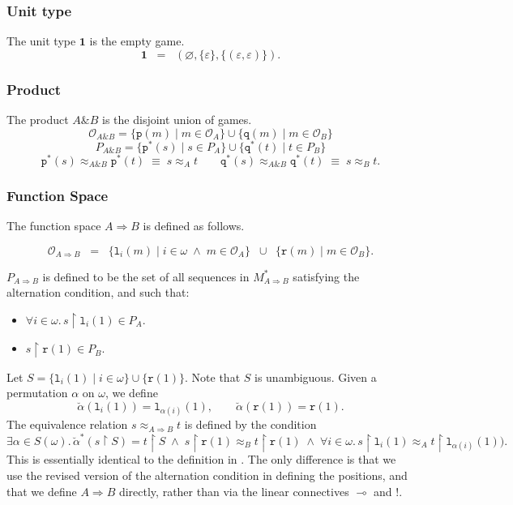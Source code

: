 \documentclass[a4paper,11pt]{article}
\newcommand{\gequiv}{\approx}
\newcommand{\restrict}{{\upharpoonright}}
\newcommand{\Occ}{\mathcal{O}}
\newcommand{\al}{\mathtt{p}}
\newcommand{\ar}{\mathtt{q}}
\newcommand{\fr}{\mathtt{r}}
\newcommand{\fl}[1]{\mathtt{l}_{#1}}
\begin{document}
\subsubsection*{Unit type}
The unit type $\mathbf{1}$ is the empty game.
\[ \mathbf{1} \;\; = \;\; ( \varnothing ,  \{ \varepsilon  \}
, \{ (\varepsilon , \varepsilon ) \} ) . \]

\subsubsection*{Product}
The product $A \& B$ is the disjoint union of games.
\[ \Occ_{A \& B} = \{ \al (m) \mid m \in \Occ_A \} \cup \{ \ar (m)
\mid m \in \Occ_B \} \]
\[ P_{A \& B} =  \{ \al^{\ast} (s) \mid s \in P_A \} \cup \{ \ar^{\ast} (t) \mid
t \in P_B \} \]
\[ \al^{\ast}(s) \gequiv_{A \& B} \al^{\ast}(t) \; \equiv \; s
\gequiv_A t \qquad \ar^{\ast}(s) \gequiv_{A \& B} \ar^{\ast}(t) \; \equiv \; s
\gequiv_B t . \]


\subsubsection*{Function Space}
The function space $A \Rightarrow B$ is defined as follows.

\[ \Occ_{A \Rightarrow B} \;\; = \;\; \{ \fl{i}(m) \mid i \in \omega
\; \wedge \; m \in \Occ_A \} \;\; \cup \;\; \{ \fr (m) \mid m \in
\Occ_B \} .  \]

\noindent $P_{A \Rightarrow B}$ is defined to be the set of all sequences in
$M_{A \Rightarrow B}^{\ast}$ satisfying the alternation condition, and
such that:
\begin{itemize}
\item $\forall i \in \omega . \, s \restrict \fl{i}(1) \in P_A$.
\item $s \restrict \fr (1) \in P_B$.
\end{itemize}
Let $S = \{ \fl{i}(1) \mid i \in \omega \} \cup \{ \fr (1) \}$. Note that
$S$ is unambiguous. Given a permutation $\alpha$ on $\omega$, we
define
\[ \breve{\alpha}(\fl{i}(1)) = \fl{\alpha (i)}(1), \qquad \breve{\alpha}(\fr
(1)) = \fr (1) . \]
The equivalence relation $s \gequiv_{A \Rightarrow B} t$ is defined by
the condition
\[ \exists \alpha \in S(\omega ) . \,
\breve{\alpha}^{\ast}(s \restrict S) = t \restrict S \; \wedge \;
s \restrict \fr (1) \gequiv_B t \restrict \fr (1)
\; \wedge \; \forall i \in \omega . \, s \restrict \fl{i}(1) \gequiv_A t
\restrict \fl{\alpha (i)}(1) ) .
\]
This is essentially identical to the definition in \cite{AJM00}. The
only difference is that we use the revised version of the alternation
condition in defining the positions, and that we define $A \Rightarrow
B$ directly, rather than via the linear connectives $\multimap$ and
$!$.
\end{document}
